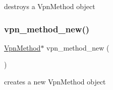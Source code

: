 destroys a Vpn\+Method object 

\mbox{\label{route-tree_8h_a3ccbf1b413fe282c1490701f739273a8}} 
\subsubsection{\texorpdfstring{vpn\+\_\+method\+\_\+new()}{vpn\_method\_new()}}
{\footnotesize\ttfamily \hyperlink{route-tree_8h_a1034dd038389279bf422489d4d99d43a}{Vpn\+Method}$\ast$ vpn\+\_\+method\+\_\+new (\begin{DoxyParamCaption}{ }\end{DoxyParamCaption})}



creates a new Vpn\+Method object 

